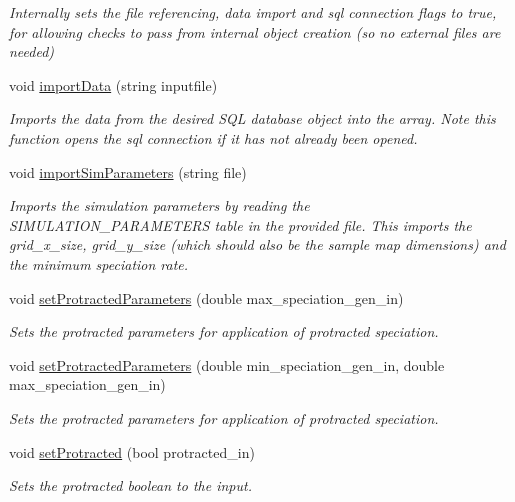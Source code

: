 \begin{DoxyCompactItemize}
\begin{DoxyCompactList}\small\item\em Internally sets the file referencing, data import and sql connection flags to true, for allowing checks to pass from internal object creation (so no external files are needed) \end{DoxyCompactList}\item 
void \hyperlink{class_treelist_a8042f6a3ab6eb1e7dc75baba20240118}{import\+Data} (string inputfile)
\begin{DoxyCompactList}\small\item\em Imports the data from the desired S\+QL database object into the array. Note this function opens the sql connection if it has not already been opened. \end{DoxyCompactList}\item 
void \hyperlink{class_treelist_ac2e1f6e132233499568af35fa57e60b5}{import\+Sim\+Parameters} (string file)
\begin{DoxyCompactList}\small\item\em Imports the simulation parameters by reading the S\+I\+M\+U\+L\+A\+T\+I\+O\+N\+\_\+\+P\+A\+R\+A\+M\+E\+T\+E\+RS table in the provided file. This imports the grid\+\_\+x\+\_\+size, grid\+\_\+y\+\_\+size (which should also be the sample map dimensions) and the minimum speciation rate. \end{DoxyCompactList}\item 
void \hyperlink{class_treelist_a8062e61c6ae961447cb71654006a1e71}{set\+Protracted\+Parameters} (double max\+\_\+speciation\+\_\+gen\+\_\+in)
\begin{DoxyCompactList}\small\item\em Sets the protracted parameters for application of protracted speciation. \end{DoxyCompactList}\item 
void \hyperlink{class_treelist_a5a0b1ddf62000375a53df9c16c548b35}{set\+Protracted\+Parameters} (double min\+\_\+speciation\+\_\+gen\+\_\+in, double max\+\_\+speciation\+\_\+gen\+\_\+in)
\begin{DoxyCompactList}\small\item\em Sets the protracted parameters for application of protracted speciation. \end{DoxyCompactList}\item 
void \hyperlink{class_treelist_a11b7efee52f995ea524ebc35ebe76cfc}{set\+Protracted} (bool protracted\+\_\+in)
\begin{DoxyCompactList}\small\item\em Sets the protracted boolean to the input. \end{DoxyCompactList}\item 

\end{DoxyCompactItemize}
